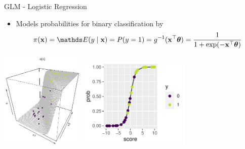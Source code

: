 \documentclass[10pt,compress,t,notes=noshow, xcolor=table]{beamer}
\begin{document}
\begin{frame}{GLM - Logistic Regression}
\begin{itemize}
    \item Models probabilities for binary classification by
    $$\pi(\xv) = \E(y \mid \xv) = P(y = 1) = g^{-1}(\xv^\top \thetav) = \frac{1}{1 + \exp(- \xv^\top \thetav)} $$
\end{itemize}
\centering
\includegraphics[width=0.3\textwidth]{figure/logreg-2vars-surface.png} \qquad
\includegraphics[width=0.4\textwidth]{figure/reg_class_log_7} 
\end{frame}
\end{document}
